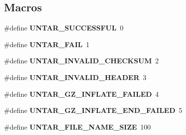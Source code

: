 \subsection*{Macros}
\begin{DoxyCompactItemize}
\item 
\mbox{\label{group__libmisc__untar__img_gac889bea1d0e643a1e472fc3470cec83c}} 
\#define {\bfseries U\+N\+T\+A\+R\+\_\+\+S\+U\+C\+C\+E\+S\+S\+F\+UL}~0
\item 
\mbox{\label{group__libmisc__untar__img_ga981b11175acf08fa5dd9184155dfcd59}} 
\#define {\bfseries U\+N\+T\+A\+R\+\_\+\+F\+A\+IL}~1
\item 
\mbox{\label{group__libmisc__untar__img_ga89953f561cd6163f2fbc3457b2bd7da6}} 
\#define {\bfseries U\+N\+T\+A\+R\+\_\+\+I\+N\+V\+A\+L\+I\+D\+\_\+\+C\+H\+E\+C\+K\+S\+UM}~2
\item 
\mbox{\label{group__libmisc__untar__img_gab492b81133bf744acaece0aecbffe5e2}} 
\#define {\bfseries U\+N\+T\+A\+R\+\_\+\+I\+N\+V\+A\+L\+I\+D\+\_\+\+H\+E\+A\+D\+ER}~3
\item 
\mbox{\label{group__libmisc__untar__img_ga97a586493efb86456951738042dc4628}} 
\#define {\bfseries U\+N\+T\+A\+R\+\_\+\+G\+Z\+\_\+\+I\+N\+F\+L\+A\+T\+E\+\_\+\+F\+A\+I\+L\+ED}~4
\item 
\mbox{\label{group__libmisc__untar__img_ga47b94b3255b3d650f348965853b0d21c}} 
\#define {\bfseries U\+N\+T\+A\+R\+\_\+\+G\+Z\+\_\+\+I\+N\+F\+L\+A\+T\+E\+\_\+\+E\+N\+D\+\_\+\+F\+A\+I\+L\+ED}~5
\item 
\mbox{\label{group__libmisc__untar__img_gadf5a8605323fac10638d0c1f8bbff1d9}} 
\#define {\bfseries U\+N\+T\+A\+R\+\_\+\+F\+I\+L\+E\+\_\+\+N\+A\+M\+E\+\_\+\+S\+I\+ZE}~100
\end{DoxyCompactItemize}
